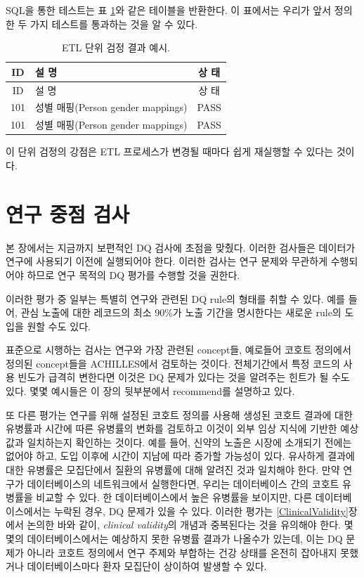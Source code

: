 \documentclass[11pt]{book}
\theoremstyle{definition}
\theoremstyle{definition}
\theoremstyle{definition}
\theoremstyle{remark}
\begin{document}
SQL을 통한 테스트는 표 \ref{tab:exampleTestResults}와 같은 테이블을
반환한다. 이 표에서는 우리가 앞서 정의한 두 가지 테스트를 통과하는 것을
알 수 있다.

\begin{longtable}[]{@{}clc@{}}
\caption{\label{tab:exampleTestResults} ETL 단위 검정 결과
예시.}\tabularnewline
\toprule
ID & 설 명 & 상 태\tabularnewline
\midrule
\endfirsthead
\toprule
ID & 설 명 & 상 태\tabularnewline
\midrule
\endhead
101 & 성별 매핑(Person gender mappings) & PASS\tabularnewline
101 & 성별 매핑(Person gender mappings) & PASS\tabularnewline
\bottomrule
\end{longtable}

이 단위 검정의 강점은 ETL 프로세스가 변경될 때마다 쉽게 재실행할 수
있다는 것이다.

\section{연구 중점 검사}\label{--}


본 장에서는 지금까지 보편적인 DQ 검사에 초점을 맞췄다. 이러한 검사들은
데이터가 연구에 사용되기 이전에 실행되어야 한다. 이러한 검사는 연구
문제와 무관하게 수행되어야 하므로 연구 목적의 DQ 평가를 수행할 것을
권한다.

이러한 평가 중 일부는 특별히 연구와 관련된 DQ rule의 형태를 취할 수
있다. 예를 들어, 관심 노출에 대한 레코드의 최소 90\%가 노출 기간을
명시한다는 새로운 rule의 도입을 원할 수도 있다.

표준으로 시행하는 검사는 연구와 가장 관련된 concept들, 예로들어 코호트
정의에서 정의된 concept들을 ACHILLES에서 검토하는 것이다. 전체기간에서
특정 코드의 사용 빈도가 급격히 변한다면 이것은 DQ 문제가 있다는 것을
알려주는 힌트가 될 수도 있다. 몇몇 예시들은 이 장의 뒷부분에서
recommend를 설명하고 있다.

또 다른 평가는 연구를 위해 설정된 코호트 정의를 사용해 생성된 코호트
결과에 대한 유병률과 시간에 따른 유병률의 변화를 검토하고 이것이 외부
임상 지식에 기반한 예상값과 일치하는지 확인하는 것이다. 예를 들어,
신약의 노출은 시장에 소개되기 전에는 없어야 하고, 도입 이후에 시간이
지남에 따라 증가할 가능성이 있다. 유사하게 결과에 대한 유병률은
모집단에서 질환의 유병률에 대해 알려진 것과 일치해야 한다. 만약 연구가
데이터베이스의 네트워크에서 실행한다면, 우리는 데이터베이스 간의 코호트
유병률을 비교할 수 있다. 한 데이터베이스에서 높은 유병률을 보이지만,
다른 데이터베이스에서는 누락된 경우, DQ 문제가 있을 수 있다. 이러한
평가는 \ref{ClinicalValidity}장에서 논의한 바와 같이, \emph{clinical
validity}의 개념과 중복된다는 것을 유의해야 한다. 몇몇의
데이터베이스에서는 예상하지 못한 유병률 결과가 나올수가 있는데, 이는 DQ
문제가 아니라 코호트 정의에서 연구 주제와 부합하는 건강 상태를 온전히
잡아내지 못했거나 데이터베이스마다 환자 모집단이 상이하여 발생할 수
있다.
\end{document}
